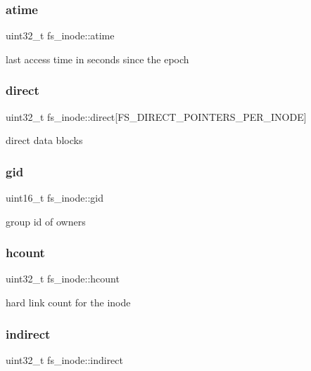 \subsubsection{\texorpdfstring{atime}{atime}}
{\footnotesize\ttfamily uint32\+\_\+t fs\+\_\+inode\+::atime}

last access time in seconds since the epoch \mbox{\label{structfs__inode_a2d0c4627d2c8925e6a51502fa47685aa}} 
\subsubsection{\texorpdfstring{direct}{direct}}
{\footnotesize\ttfamily uint32\+\_\+t fs\+\_\+inode\+::direct\mbox{[}F\+S\+\_\+\+D\+I\+R\+E\+C\+T\+\_\+\+P\+O\+I\+N\+T\+E\+R\+S\+\_\+\+P\+E\+R\+\_\+\+I\+N\+O\+DE\mbox{]}}

direct data blocks \mbox{\label{structfs__inode_a93b1c3bdde3437a4dbfe538ffe47dc01}} 
\subsubsection{\texorpdfstring{gid}{gid}}
{\footnotesize\ttfamily uint16\+\_\+t fs\+\_\+inode\+::gid}

group id of owners \mbox{\label{structfs__inode_a0057adf5604e607679e68a94ab3e5cd9}} 
\subsubsection{\texorpdfstring{hcount}{hcount}}
{\footnotesize\ttfamily uint32\+\_\+t fs\+\_\+inode\+::hcount}

hard link count for the inode \mbox{\label{structfs__inode_a5cde1770f044b6566f36f6acdf958beb}} 
\subsubsection{\texorpdfstring{indirect}{indirect}}
{\footnotesize\ttfamily uint32\+\_\+t fs\+\_\+inode\+::indirect}

